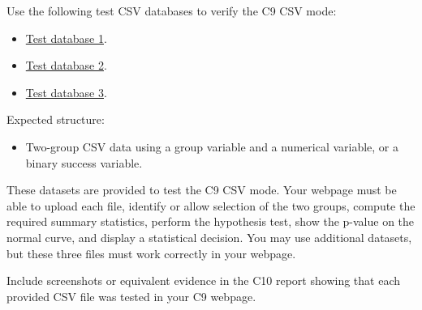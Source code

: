 \documentclass[12pt]{article}
\begin{document}
	Use the following test CSV databases to verify the C9 CSV mode:
	\begin{itemize}
		\item \href{https://correosanbartoloedu-my.sharepoint.com/:x:/g/personal/nicolas_lopez_sanbartolo_edu_co/IQDrjLHubKjOSrn8CecqSvt6Ab8uVPrlO_6yx6cuRO0WHpY?e=Lokwys}{Test database 1}.
		\item \href{https://correosanbartoloedu-my.sharepoint.com/:x:/g/personal/nicolas_lopez_sanbartolo_edu_co/IQB0v-LRl2wBSYBW3kW1PdmuAZaRhLywPzOwclnt5ntUEXY?e=fjMM2j}{Test database 2}.
		\item \href{https://correosanbartoloedu-my.sharepoint.com/:x:/g/personal/nicolas_lopez_sanbartolo_edu_co/IQDrjLHubKjOSrn8CecqSvt6Ab8uVPrlO_6yx6cuRO0WHpY?e=MUj6aF}{Test database 3}.
	\end{itemize}

	Expected structure:
	\begin{itemize}
		\item Two-group CSV data using a group variable and a numerical variable, or a binary success variable.
	\end{itemize}
	
	These datasets are provided to test the C9 CSV mode. Your webpage must be able to upload each file, identify or allow selection of the two groups, compute the required summary statistics, perform the hypothesis test, show the p-value on the normal curve, and display a statistical decision. You may use additional datasets, but these three files must work correctly in your webpage.
	
	Include screenshots or equivalent evidence in the C10 report showing that each provided CSV file was tested in your C9 webpage.
	
\end{document}
